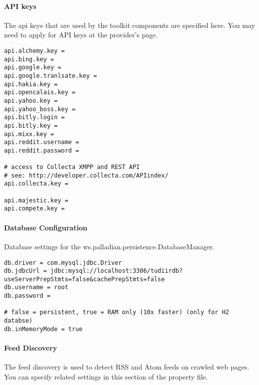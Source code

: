 \paragraph{API keys}
\label{sec:apikeys.conf}
The api keys that are used by the toolkit components are specified here. You may need to apply for API keys at the provider's page.

\begin{verbatim}
api.alchemy.key = 
api.bing.key = 
api.google.key = 
api.google.tranlsate.key = 
api.hakia.key =
api.opencalais.key =
api.yahoo.key = 
api.yahoo_boss.key = 
api.bitly.login = 
api.bitly.key = 
api.mixx.key = 
api.reddit.username = 
api.reddit.password = 

# access to Collecta XMPP and REST API
# see: http://developer.collecta.com/APIindex/
api.collecta.key = 

api.majestic.key = 
api.compete.key = 
\end{verbatim}

\paragraph{Database Configuration}
Database settings for the ws.palladian.persistence.DatabaseManager.

\begin{verbatim}
db.driver = com.mysql.jdbc.Driver
db.jdbcUrl = jdbc:mysql://localhost:3306/tudiirdb?useServerPrepStmts=false&cachePrepStmts=false
db.username = root
db.password = 

# false = persistent, true = RAM only (10x faster) (only for H2 databse)
db.inMemoryMode = true 
\end{verbatim}

\paragraph{Feed Discovery}
\label{par:feeddiscovery}
The feed discovery is used to detect RSS and Atom feeds on crawled web pages. You can specify related settings in this section of the property file.

